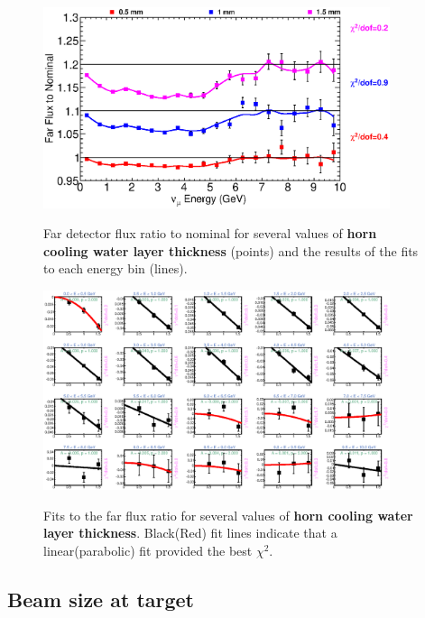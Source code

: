 \begin{figure}[ht]
  \begin{center}
    {\includegraphics[width=4.0in]{figures/NominalWaterLayer__far_summary.eps}}
  \end{center}
\caption{ Far detector flux ratio to nominal for several values of {\bf horn cooling water layer thickness} (points) and the results of the fits to each energy bin (lines).}
\end{figure}

\begin{figure}[hb]
  \begin{center}
    {\includegraphics[width=4.0in]{figures/NominalWaterLayer__far_fits.eps}}
  \end{center}
\caption{ Fits to the far flux ratio for several values of {\bf horn cooling water layer thickness}. Black(Red) fit lines indicate that a linear(parabolic) fit provided the best $\chi^2$. }
\end{figure}

\clearpage
\subsection{Beam size at target}

